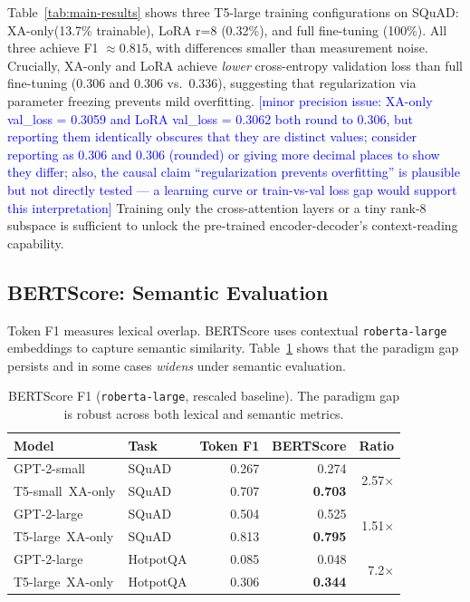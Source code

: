 \documentclass[11pt]{article}
\newcommand{\techcheck}[1]{\textcolor{blue}{[#1]}}
\newcommand{\tssmall}{T5-small\xspace}
\newcommand{\tslarge}{T5-large\xspace}
\newcommand{\gptsmall}{GPT-2-small\xspace}
\newcommand{\gptlarge}{GPT-2-large\xspace}
\newcommand{\xaonly}{XA-only\xspace}
\newcommand{\squad}{SQuAD\xspace}
\newcommand{\hotpotqa}{HotpotQA\xspace}
\begin{document}
Table~\ref{tab:main-results} shows three T5-large training configurations
on \squad: \xaonly (13.7\% trainable), LoRA r=8 (0.32\%), and full fine-tuning
(100\%).
All three achieve F1 $\approx 0.815$, with differences smaller than measurement
noise.
Crucially, \xaonly and LoRA achieve \emph{lower} cross-entropy validation loss
than full fine-tuning (0.306 and 0.306 vs.\ 0.336), suggesting that regularization
via parameter freezing prevents mild overfitting.
\techcheck{minor precision issue: XA-only val\_loss = 0.3059 and LoRA val\_loss = 0.3062 both round to 0.306, but reporting them identically obscures that they are distinct values; consider reporting as 0.306 and 0.306 (rounded) or giving more decimal places to show they differ; also, the causal claim ``regularization prevents overfitting'' is plausible but not directly tested --- a learning curve or train-vs-val loss gap would support this interpretation}
Training only the cross-attention layers or a tiny rank-8 subspace is sufficient
to unlock the pre-trained encoder-decoder's context-reading capability.

\subsection{BERTScore: Semantic Evaluation}
\label{sec:bertscore}

Token F1 measures lexical overlap.
BERTScore \citep{zhang2020bertscore} uses contextual \texttt{roberta-large}
embeddings to capture semantic similarity.
Table~\ref{tab:bertscore} shows that the paradigm gap persists and in some cases
\emph{widens} under semantic evaluation.

\begin{table}[t]
  \centering
  \small
  \caption{BERTScore F1 (\texttt{roberta-large}, rescaled baseline).
  The paradigm gap is robust across both lexical and semantic metrics.}
  \label{tab:bertscore}
  \begin{tabular}{llrrr}
    \toprule
    Model & Task & Token F1 & BERTScore & Ratio \\
    \midrule
    \gptsmall  & \squad    & 0.267 & 0.274 & \multirow{2}{*}{2.57$\times$} \\
    \tssmall~\xaonly & \squad    & 0.707 & \textbf{0.703} & \\
    \midrule
    \gptlarge  & \squad    & 0.504 & 0.525 & \multirow{2}{*}{1.51$\times$} \\
    \tslarge~\xaonly & \squad    & 0.813 & \textbf{0.795} & \\
    \midrule
    \gptlarge  & \hotpotqa & 0.085 & 0.048 & \multirow{2}{*}{7.2$\times$} \\
    \tslarge~\xaonly & \hotpotqa & 0.306 & \textbf{0.344} & \\
    \bottomrule
  \end{tabular}
\end{table}
\end{document}
